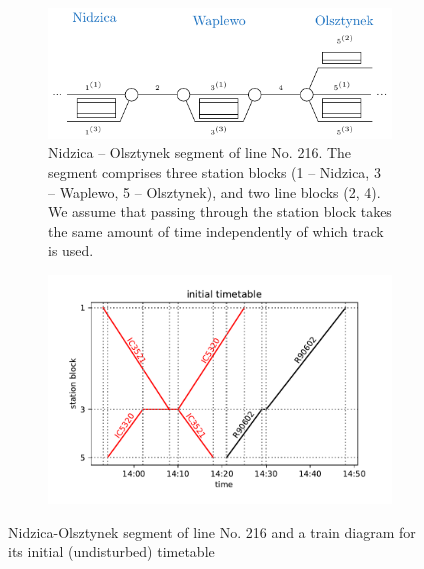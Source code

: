 \begin{figure}
  \begin{subfigure}{\textwidth}
    \includegraphics[width=\textwidth]{figures/line_small.pdf}
    \caption{Nidzica -- Olsztynek segment of line No. 216. The segment comprises three
      station blocks (1 -- Nidzica, 3 -- Waplewo, 5 -- Olsztynek), and two line
      blocks (2, 4). We assume that passing through the station block takes the same
      amount of time independently of which track is used. } \label{fig:linesmall}
  \end{subfigure}
  \begin{subfigure}{\textwidth}
    \includegraphics[width=\textwidth]{figures/train_diagram_small}
    \label{fig:diagramsmall}
  \end{subfigure}
  \caption{Nidzica-Olsztynek segment of line No. 216 and a train diagram for its initial
    (undisturbed) timetable}
\end{figure}

